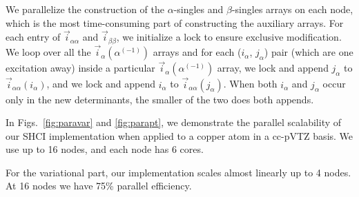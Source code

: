 \documentclass[%
preprint,
 superscriptaddress,
 amsmath,amssymb,
 aps,
]{revtex4-1}
\def\ia{i_\alpha}
\def\ja{j_\alpha}
\def\vecia{\vec{i}_\alpha}
\def\veciaa{\vec{i}_{\alpha\alpha}}
\def\vecibb{\vec{i}_{\beta\beta}}
\begin{document}

We parallelize the construction of the $\alpha$-singles and $\beta$-singles arrays on each node, which is the most time-consuming part of constructing the auxiliary arrays.
For each entry of $\veciaa$ and $\vecibb$, we initialize a lock to ensure exclusive modification.
We loop over all the $\vecia({\alpha^{(-1)}})$ arrays and for each ($\ia$, $\ja$) pair (which are one excitation away) inside a particular $\vecia({\alpha^{(-1)}})$ array,
we lock and append $\ja$ to $\veciaa{(\ia)}$, and
we lock and append $\ia$ to $\veciaa{(\ja)}$.
When both $\ia$ and $\ja$ occur only in the new determinants, the smaller of the two does both appends.

In Figs.~\ref{fig:paravar} and \ref{fig:parapt}, we demonstrate the parallel scalability of our SHCI implementation
when applied to a copper atom in a cc-pVTZ basis. We use up to 16 nodes, and each node has 6 cores.

For the variational part, our implementation scales almost linearly up to 4 nodes.
At 16 nodes we have 75\% parallel efficiency.
\end{document}
